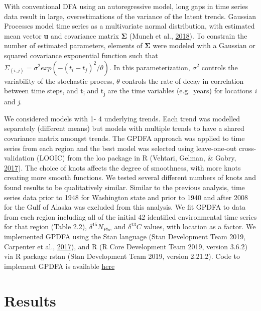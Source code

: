 \documentclass [11pt, proquest] {uwthesis}[2015/03/03]
\begin{document}
With conventional DFA using an autoregressive model, long gaps in time
series data result in large, overestimations of the variance of the
latent trends. Gaussian Processes model time series as a multivariate
normal distribution, with estimated mean vector \textbf{u} and
covariance matrix \textbf{Σ} (Munch et al.,
\protect\hyperlink{ref-Munch2018}{2018}). To constrain the number of
estimated parameters, elements of \textbf{Σ} were modeled with a
Gaussian or squared covariance exponential function such that
\(\Sigma_{(i,j)}= \sigma^2 exp(-(t_i-t_j )^2/\theta)\). In this
parameterization, \(\sigma^2\) controls the variability of the
stochastic process, \(\theta\) controls the rate of decay in correlation
between time steps, and t\textsubscript{i} and t\textsubscript{j} are
the time variables (e.g.~years) for locations \emph{i} and \emph{j}.

We considered models with 1- 4 underlying trends. Each trend was
modelled separately (different means) but models with multiple trends to
have a shared covariance matrix amongst trends. The GPDFA approach was
applied to time series from each region and the best model was selected
using leave-one-out cross-validation (LOOIC) from the loo package in R
(Vehtari, Gelman, \& Gabry, \protect\hyperlink{ref-Vehtari2017}{2017}).
The choice of knots affects the degree of smoothness, with more knots
creating more smooth functions. We tested several different numbers of
knots and found results to be qualitatively similar. Similar to the
previous analysis, time series data prior to 1948 for Washington state
and prior to 1940 and after 2008 for the Gulf of Alaska was excluded
from this analysis. We fit GPDFA to data from each region including all
of the initial 42 identified environmental time series for that region
(Table 2.2), \(\delta^{15}N_{Phe}\) and \(\delta^{13}C\) values, with
location as a factor. We implemented GPDFA using the Stan language (Stan
Development Team 2019, Carpenter et al.,
\protect\hyperlink{ref-Carpenter2017}{2017}), and R (R Core Development
Team 2019, version 3.6.2) via R package rstan (Stan Development Team
2019, version 2.21.2). Code to implement GPDFA is available
\href{https://github.com/mfeddern/CSIA-AA/blob/master/SourceData/Src/Analysis/gpdfa.stan}{here}

\section{Results}\label{results-1}
\end{document}
